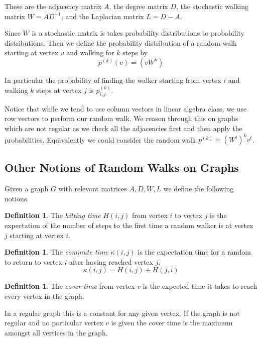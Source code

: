 \documentclass{article}
\theoremstyle{definition}
\newtheorem{defn}[thm]{Definition}
\theoremstyle{remark}
\numberwithin{equation}{section}
\begin{document}
These are the adjacency matrix $A$, the degree matrix $D$, the stochastic walking matrix $W = AD^{-1}$, and the Laplacian matrix $L = D-A$.

Since $W$ is a stochastic matrix is takes probability distributions to probability distributions.  Then we define the probability distribution of a random walk starting at vertex $v$ and walking for $k$ steps by
\begin{equation}
p^{(k)}(v) = (v W^k)
\end{equation}

In particular the probability of finding the walker starting from vertex $i$ and walking $k$ steps at vertex $j$ is $p^{(k)}_{i,j}$.


Notice that while we tend to use column vectors in linear algebra class, we use row vectors to perform our random walk.  We reason through this on graphs which are not regular as we check all the adjacencies first and then apply the probabilities.  Equivalently we could consider the random walk $p^{(k)} = (W^t)^k v^t$.


\subsection{Other Notions of Random Walks on Graphs}

Given a graph $G$ with relevant matrices $A,D,W,L$ we define the following notions.

\begin{defn}
The \emph{hitting time} $H(i,j)$ from vertex $i$ to vertex $j$ is the expectation of the number of steps to the first time a random walker is at vertex $j$ starting at vertex $i$.
\end{defn}

\begin{defn}
The \emph{commute time} $\kappa(i,j)$ is the expectation time for a random to return to vertex $i$ after having reached vertex $j$.
\[
\kappa(i,j) = H(i,j) + H(j,i)
\]
\end{defn}

\begin{defn}
The \emph{cover time} from vertex $v$ is the expected time it takes to reach every vertex in the graph. 
\end{defn}

In a regular graph this is a constant for any given vertex.  If the graph is not regular and no particular vertex $v$ is given the cover time is the maximum amongst all vertices in the graph.
\end{document}
